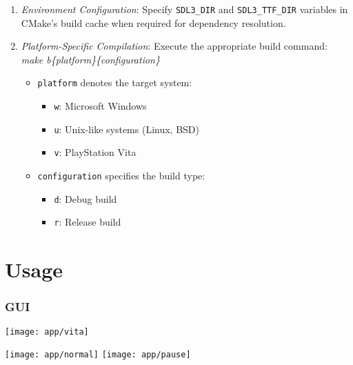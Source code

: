 \begin{enumerate}
    \item \textit{Environment Configuration}: Specify \texttt{SDL3\_DIR} and \texttt{SDL3\_TTF\_DIR} variables in CMake's build cache when required for dependency resolution.
    
    \item \textit{Platform-Specific Compilation}: Execute the appropriate build command:\\\textit{  make b\{platform\}\{configuration\}}
    \begin{itemize}
        \item \texttt{platform} denotes the target system:
        \begin{itemize}
            \item \texttt{w}: Microsoft Windows
            \item \texttt{u}: Unix-like systems (Linux, BSD)
            \item \texttt{v}: PlayStation Vita
        \end{itemize}
        \item \texttt{configuration} specifies the build type:
        \begin{itemize}
            \item \texttt{d}: Debug build
            \item \texttt{r}: Release build
        \end{itemize}
    \end{itemize}
\end{enumerate}

\clearpage

\section{Usage}
\label{sec:ch4sec3}

\subsubsection{GUI}
\label{sec:ch4sec4subsub1}

\begin{minipage}{\linewidth}
\centering
\texttt{[image: app/vita]}
\end{minipage}

\begin{minipage}{\linewidth}
\centering
\texttt{[image: app/normal]}
\texttt{[image: app/pause]}
\end{minipage}